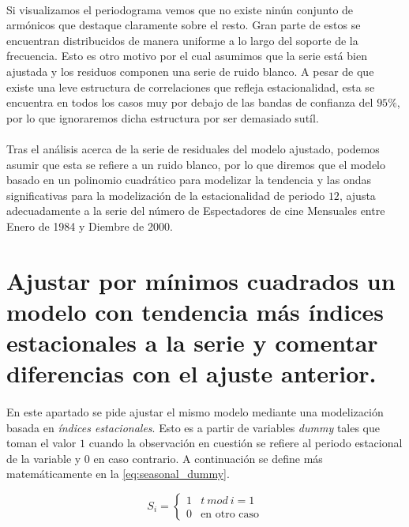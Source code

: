 \documentclass[a4paper, spanish]{article}
\begin{document}
    \paragraph{}
    Si visualizamos el periodograma vemos que no existe ninún conjunto de armónicos que destaque claramente sobre el resto. Gran parte de estos se encuentran distribucidos de manera uniforme a lo largo del soporte de la frecuencia. Esto es otro motivo por el cual asumimos que la serie está bien ajustada y los residuos componen una serie de ruido blanco. A pesar de que existe una leve estructura de correlaciones que refleja estacionalidad, esta se encuentra en todos los casos muy por debajo de las bandas de confianza del $95\%$, por lo que ignoraremos dicha estructura por ser demasiado sutíl.

    \paragraph{}
    Tras el análisis acerca de la serie de residuales del modelo ajustado, podemos asumir que esta se refiere a un ruido blanco, por lo que diremos que el modelo basado en un polinomio cuadrático para modelizar la tendencia  y las ondas significativas para la modelización de la estacionalidad de periodo $12$, ajusta adecuadamente a la serie del número de Espectadores de cine Mensuales entre Enero de 1984 y Diembre de 2000.

  \section{Ajustar por mínimos cuadrados un modelo con tendencia más índices estacionales a la serie y comentar diferencias con el ajuste anterior.}

    \paragraph{}
    En este apartado se pide ajustar el mismo modelo mediante una modelización basada en \emph{índices estacionales}. Esto es a partir de variables \emph{dummy} tales que toman el valor $1$ cuando la observación en cuestión se refiere al periodo estacional de la variable y $0$ en caso contrario. A continuación se define más matemáticamente en la \autoref{eq:seasonal_dummy}.

    \begin{equation}
    \label{eq:seasonal_dummy}
      S_i =
      \begin{cases}
        1 & t \ mod \ i = 1 \\
        0 & \text{en otro caso}
     \end{cases}
    \end{equation}
\end{document}
